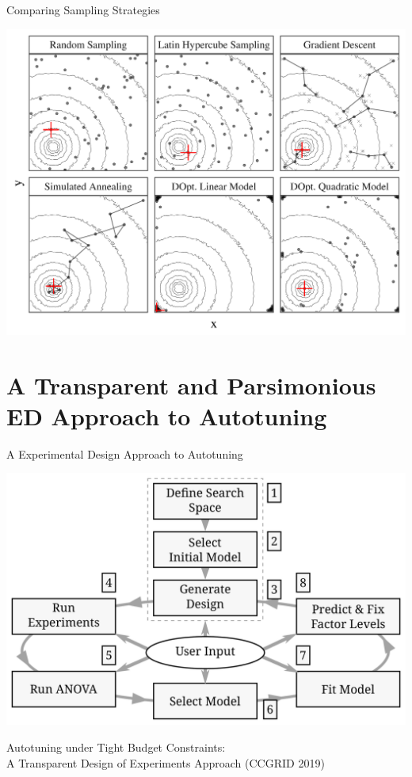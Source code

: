 \documentclass[10pt, compress, aspectratio=169, xcolor={table,usenames,dvipsnames}]{beamer}
\begin{document}
\begin{frame}[label={sec:orgc5ba8cc}]{Comparing Sampling Strategies}
\begin{center}
\begin{center}
\includegraphics[width=.72\textwidth]{../../../img/sampling_comparison.pdf}
\end{center}
\end{center}
\end{frame}
\section{A Transparent and Parsimonious ED Approach to Autotuning}
\label{sec:org5328926}
\begin{frame}[label={sec:org90b6933}]{A Experimental Design Approach to Autotuning}
\begin{center}
\begin{center}
\includegraphics[width=.74\linewidth]{../../../img/doe_anova_strategy.pdf}
\end{center}

\vspace{-.2cm}
\end{center}

\begin{center}
\scriptsize{Autotuning under Tight Budget Constraints: \\ A Transparent Design of Experiments Approach (CCGRID 2019)}
\end{center}
\end{frame}
\end{document}
